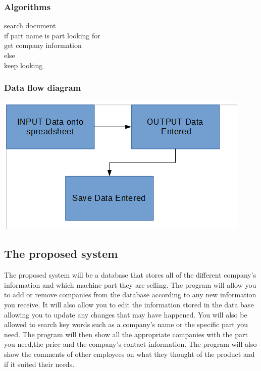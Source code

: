 \subsubsection{Algorithms}

search document\\
if part name is part looking for\\
get company information\\
else\\
keep looking

\subsubsection{Data flow diagram}
\includegraphics{FCCS.jpg}
\clearpage

\subsection{The proposed system}
The proposed system will be a database that stores all of the different company's information and which machine part they are selling. The program will allow you to add or remove companies from the database according to any new information you receive. It will also allow you to edit the information stored in the data base allowing you to update any changes that may have happened. You will also be allowed to search key words such as a company's name or the specific part you need. The program will then show all the appropriate companies with the part you need,the price and the company's contact information. The program will also show the comments of other employees on what they thought of the product and if it suited their needs.

